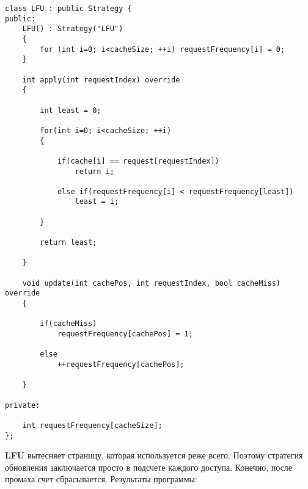 \begin{tcolorbox}
\begin{verbatim}
class LFU : public Strategy {
public:
    LFU() : Strategy("LFU")
    {
        for (int i=0; i<cacheSize; ++i) requestFrequency[i] = 0;
    }
    
    int apply(int requestIndex) override
    {
        
        int least = 0;
        
        for(int i=0; i<cacheSize; ++i)
        {
        
            if(cache[i] == request[requestIndex])
                return i;
            
            else if(requestFrequency[i] < requestFrequency[least])
                least = i;
        
        }
        
        return least;
    
    }
    
    void update(int cachePos, int requestIndex, bool cacheMiss) override
    {
        
        if(cacheMiss)
            requestFrequency[cachePos] = 1;
        
        else
            ++requestFrequency[cachePos];
        
    }

private:

    int requestFrequency[cacheSize];
};
\end{verbatim}
\end{tcolorbox}

\textbf{LFU} вытесняет страницу, которая используется реже всего. Поэтому стратегия обновления заключается просто в подсчете каждого доступа. Конечно, после промаха счет сбрасывается. Результаты программы:

